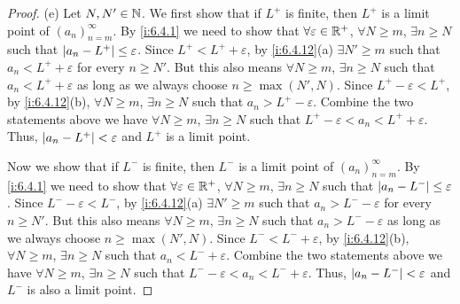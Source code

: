 \begin{proof}{(e)}
  Let \(N, N' \in \mathbb{N}\).
  We first show that if \(L^+\) is finite, then \(L^+\) is a limit point of \((a_n)_{n = m}^\infty\).
  By \cref{i:6.4.1} we need to show that \(\forall \varepsilon \in \mathbb{R}^+\), \(\forall N \geq m\), \(\exists n \geq N\) such that \(\left\lvert a_n - L^+\right\rvert \leq \varepsilon\).
  Since \(L^+ < L^+ + \varepsilon\), by \cref{i:6.4.12}(a) \(\exists N' \geq m\) such that \(a_n < L^+ + \varepsilon\) for every \(n \geq N'\).
  But this also means \(\forall N \geq m\), \(\exists n \geq N\) such that \(a_n < L^+ + \varepsilon\) as long as we always choose \(n \geq \max(N', N)\).
  Since \(L^+ - \varepsilon < L^+\), by \cref{i:6.4.12}(b), \(\forall N \geq m\), \(\exists n \geq N\) such that \(a_n > L^+ - \varepsilon\).
  Combine the two statements above we have \(\forall N \geq m\), \(\exists n \geq N\) such that \(L^+ - \varepsilon < a_n < L^+ + \varepsilon\).
  Thus, \(\left\lvert a_n - L^+\right\rvert < \varepsilon\) and \(L^+\) is a limit point.

  Now we show that if \(L^-\) is finite, then \(L^-\) is a limit point of \((a_n)_{n = m}^\infty\).
  By \cref{i:6.4.1} we need to show that \(\forall \varepsilon \in \mathbb{R}^+\), \(\forall N \geq m\), \(\exists n \geq N\) such that \(\left\lvert a_n - L^-\right\rvert \leq \varepsilon\).
  Since \(L^- - \varepsilon < L^-\), by \cref{i:6.4.12}(a) \(\exists N' \geq m\) such that \(a_n > L^- - \varepsilon\) for every \(n \geq N'\).
  But this also means \(\forall N \geq m\), \(\exists n \geq N\) such that \(a_n > L^- - \varepsilon\) as long as we always choose \(n \geq \max(N', N)\).
  Since \(L^- < L^- + \varepsilon\), by \cref{i:6.4.12}(b), \(\forall N \geq m\), \(\exists n \geq N\) such that \(a_n < L^- + \varepsilon\).
  Combine the two statements above we have \(\forall N \geq m\), \(\exists n \geq N\) such that \(L^- - \varepsilon < a_n < L^- + \varepsilon\).
  Thus, \(\left\lvert a_n - L^-\right\rvert < \varepsilon\) and \(L^-\) is also a limit point.
\end{proof}

